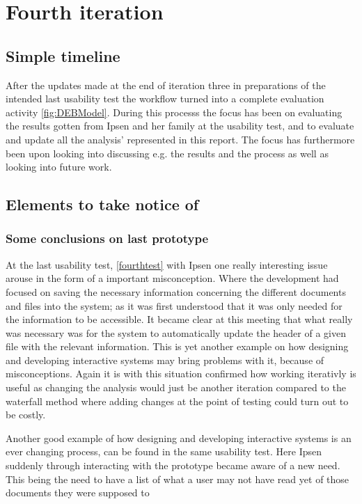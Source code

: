 \section{Fourth iteration}
\subsection{Simple timeline}\label{sec:3Iteration-timeline}
After the updates made at the end of iteration three in preparations of the intended last usability test the workflow turned into a complete evaluation activity \cref{fig:DEBModel}.
During this processs the focus has been on evaluating the results gotten from Ipsen and her family at the usability test, and to evaluate and update all the analysis' represented in this report.
The focus has furthermore been upon looking into discussing e.g. the results and the process as well as looking into future work. 

\subsection{Elements to take notice of}
\subsubsection*{Some conclusions on last prototype}
At the last usability test, \cref{fourthtest}  with Ipsen one really interesting issue arouse in the form of a important misconception.
Where the development had focused on saving the necessary information concerning the different documents and files into the system; as it was first understood that it was only needed for the information to be accessible.
It became clear at this meeting that what really was necessary was for the system to automatically update the header of a given file  with the relevant information.
This is yet another example on how designing and developing interactive systems may bring problems with it, because of misconceptions.
Again it is with this situation confirmed how working iterativly is useful as changing the analysis would just be another iteration compared to the waterfall method where adding changes at the point of testing could turn out to be costly.

Another good example of how designing and developing interactive systems is an ever changing process, can be found in the same usability test.
Here Ipsen suddenly through interacting with the prototype became aware of a new need.
This being the need to have a list of what a user may not have read yet of those documents they were supposed to